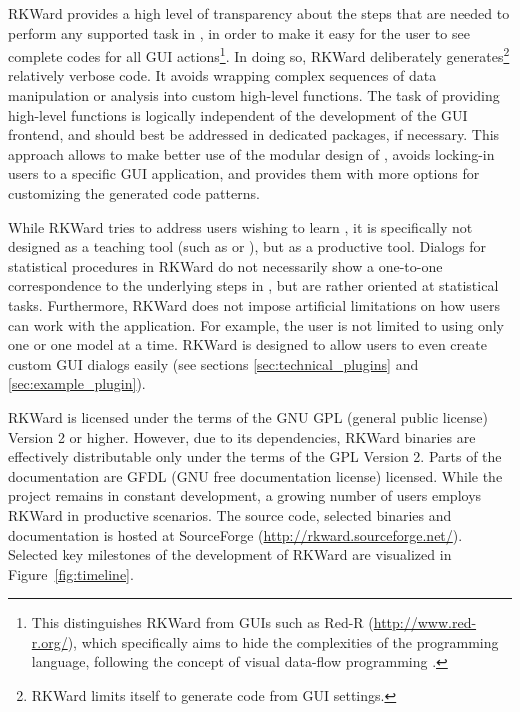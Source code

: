 RKWard provides a high level of transparency about the steps that are needed to
perform any supported task in , in order to make it easy for the user to see
complete codes for all GUI actions\footnote{
  This distinguishes RKWard from  GUIs such as Red-R (\url{http://www.red-r.org/}), which 
  specifically aims to hide the complexities of the  programming language, following the concept of visual data-flow 
  programming \citep{Sutherland1966}.
}. In doing so, RKWard deliberately generates\footnote{
  RKWard limits itself to generate  code from GUI settings.
} relatively verbose code. It avoids wrapping complex sequences of data
manipulation or analysis into custom high-level  functions. The task of
providing high-level functions is logically independent of the development of the
GUI frontend, and should best be addressed in dedicated  packages, if necessary.
This approach allows to make better use of the modular design of , avoids
locking-in users to a specific GUI application, and provides them with more options for
customizing the generated code patterns.

While RKWard tries to address users wishing to learn , it is specifically not
designed as a teaching tool (such as  or ), but as
a productive tool. Dialogs for statistical procedures in RKWard do not
necessarily show a one-to-one correspondence to the underlying steps in , but are
rather oriented at statistical tasks. Furthermore, RKWard does not impose
artificial limitations on how users can work with the application. For example,
the user is not limited to using only one  or one model at a
time. RKWard is designed to allow users to even create custom GUI dialogs
easily (see sections \ref{sec:technical_plugins} and \ref{sec:example_plugin}).

RKWard is licensed under the terms of the GNU GPL (general public license) Version 2
or higher. However, due to its dependencies, RKWard binaries are effectively
distributable only under the terms of the GPL Version 2. Parts of the documentation are
GFDL (GNU free documentation license) licensed. While the project remains in constant development, a growing
number of users employs RKWard in productive scenarios. The source code,
selected binaries and documentation is hosted at SourceForge
(\url{http://rkward.sourceforge.net/}). Selected key milestones of the development of RKWard are
visualized in Figure~\ref{fig:timeline}.

